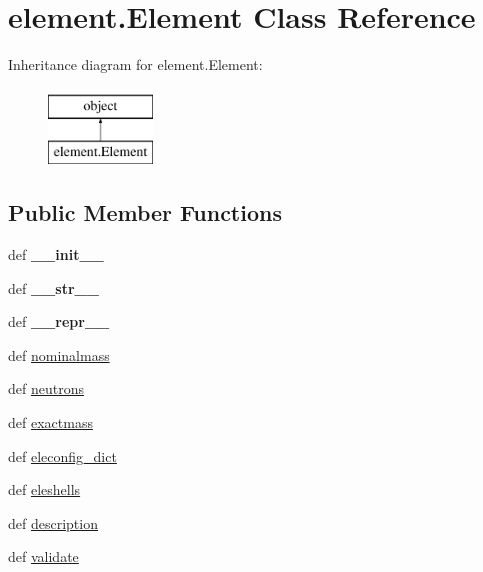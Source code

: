 \hypertarget{classelement_1_1Element}{\section{element.\+Element Class Reference}
\label{classelement_1_1Element}
}
Inheritance diagram for element.\+Element\+:\begin{figure}[H]
\begin{center}
\leavevmode
\includegraphics[height=2.000000cm]{classelement_1_1Element}
\end{center}
\end{figure}
\subsection*{Public Member Functions}
\begin{DoxyCompactItemize}
\item 
\hypertarget{classelement_1_1Element_afdc7b7986e3d6aad311573f3c2534b85}{def {\bfseries \+\_\+\+\_\+init\+\_\+\+\_\+}}\label{classelement_1_1Element_afdc7b7986e3d6aad311573f3c2534b85}

\item 
\hypertarget{classelement_1_1Element_a742f94002c18f60d4a3c384b51925c69}{def {\bfseries \+\_\+\+\_\+str\+\_\+\+\_\+}}\label{classelement_1_1Element_a742f94002c18f60d4a3c384b51925c69}

\item 
\hypertarget{classelement_1_1Element_ae1907c0f9d227680d5adbbe043319439}{def {\bfseries \+\_\+\+\_\+repr\+\_\+\+\_\+}}\label{classelement_1_1Element_ae1907c0f9d227680d5adbbe043319439}

\item 
def \hyperlink{classelement_1_1Element_a03f0d947587085800e751ca03b6be838}{nominalmass}
\item 
def \hyperlink{classelement_1_1Element_a724eecca89aa1b702bc28e4f677c153b}{neutrons}
\item 
def \hyperlink{classelement_1_1Element_ad8a714b6fff3ff4fecfaaa18a0a154b0}{exactmass}
\item 
def \hyperlink{classelement_1_1Element_a79948ad87c3aca7399fc020751237816}{eleconfig\+\_\+dict}
\item 
def \hyperlink{classelement_1_1Element_aaf89f4509db83e7b508684d406e6c424}{eleshells}
\item 
def \hyperlink{classelement_1_1Element_afa89449c3f12453d39aba4c0b4c3231b}{description}
\item 
def \hyperlink{classelement_1_1Element_a5b38ca7d1691ffca9dc6f1a52c479dec}{validate}
\end{DoxyCompactItemize}
